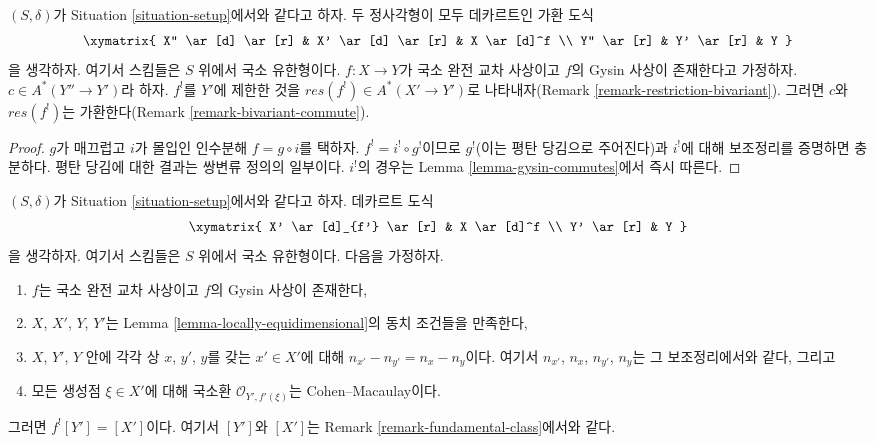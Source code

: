 \begin{lemma}
\label{lemma-lci-gysin-commutes}
$(S, \delta)$가 Situation \ref{situation-setup}에서와 같다고 하자.
두 정사각형이 모두 데카르트인 가환 도식
$$
\xymatrix{
X'' \ar[d] \ar[r] &
X' \ar[d] \ar[r] &
X \ar[d]^f \\
Y'' \ar[r] &
Y' \ar[r] &
Y
}
$$
을 생각하자. 여기서 스킴들은 $S$ 위에서 국소 유한형이다.
$f : X \to Y$가 국소 완전 교차 사상이고 $f$의 Gysin 사상이
존재한다고 가정하자. $c \in A^*(Y'' \to Y')$라 하자. $f^!$를 $Y'$에
제한한 것을 $res(f^!) \in A^*(X' \to Y')$로 나타내자(Remark
\ref{remark-restriction-bivariant}). 그러면 $c$와 $res(f^!)$는
가환한다(Remark \ref{remark-bivariant-commute}).
\end{lemma}

\begin{proof}
$g$가 매끄럽고 $i$가 몰입인 인수분해 $f = g \circ i$를 택하자.
$f^! = i^! \circ g^!$이므로 $g^!$(이는 평탄 당김으로 주어진다)과
$i^!$에 대해 보조정리를 증명하면 충분하다. 평탄 당김에 대한 결과는
쌍변류 정의의 일부이다. $i^!$의 경우는 Lemma
\ref{lemma-gysin-commutes}에서 즉시 따른다.
\end{proof}

\begin{lemma}
\label{lemma-lci-gysin-easy}
$(S, \delta)$가 Situation \ref{situation-setup}에서와 같다고 하자.
데카르트 도식
$$
\xymatrix{
X' \ar[d]_{f'} \ar[r] &
X \ar[d]^f \\
Y' \ar[r] &
Y
}
$$
을 생각하자. 여기서 스킴들은 $S$ 위에서 국소 유한형이다. 다음을
가정하자.
\begin{enumerate}
\item $f$는 국소 완전 교차 사상이고 $f$의 Gysin 사상이 존재한다,
\item $X$, $X'$, $Y$, $Y'$는 Lemma
\ref{lemma-locally-equidimensional}의 동치 조건들을 만족한다,
\item $X$, $Y'$, $Y$ 안에 각각 상 $x$, $y'$, $y$를 갖는
$x' \in X'$에 대해 $n_{x'} - n_{y'} = n_x - n_y$이다. 여기서
$n_{x'}$, $n_x$, $n_{y'}$, $n_y$는 그 보조정리에서와 같다, 그리고
\item 모든 생성점 $\xi \in X'$에 대해 국소환
$\mathcal{O}_{Y', f'(\xi)}$는 Cohen--Macaulay이다.
\end{enumerate}
그러면 $f^![Y'] = [X']$이다. 여기서 $[Y']$와 $[X']$는 Remark
\ref{remark-fundamental-class}에서와 같다.
\end{lemma}

